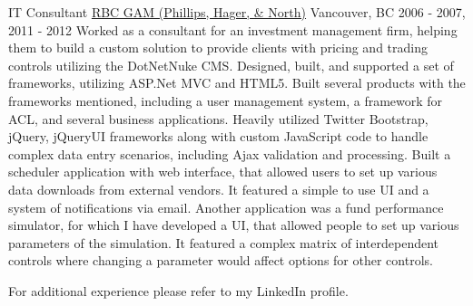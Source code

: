 \begin{cventries}
  \cventry
    {IT Consultant}
    {\href{https://www.phn.com}{\faGlobe\enspace RBC GAM (Phillips, Hager, \& North)}}
    {Vancouver, BC}
    {2006 - 2007, 2011 - 2012}
    {
      Worked as a consultant for an investment management firm, helping them to build a custom solution to provide clients with pricing and trading controls utilizing the DotNetNuke CMS. Designed, built, and supported a set of frameworks, utilizing ASP.Net MVC and HTML5. Built several products with the frameworks mentioned, including a user management system, a framework for ACL, and several business applications. Heavily utilized Twitter Bootstrap, jQuery, jQueryUI frameworks along with custom JavaScript code to handle complex data entry scenarios, including Ajax validation and processing. Built a scheduler application with web interface, that allowed users to set up various data downloads from external vendors. It featured a simple to use UI and a system of notifications via email. Another application was a fund performance simulator, for which I have developed a UI, that allowed people to set up various parameters of the simulation. It featured a complex matrix of interdependent controls where changing a parameter would affect options for other controls.
    }
    
  {
    \footnotesize For additional experience please refer to my LinkedIn profile.
  }
\end{cventries}

